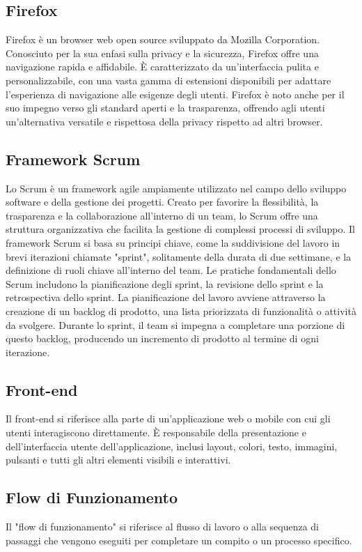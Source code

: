 \documentclass{article}
\begin{document}
\subsection{Firefox}
Firefox è un browser web open source sviluppato da Mozilla Corporation. Conosciuto per la sua enfasi sulla privacy e la sicurezza, Firefox offre una navigazione rapida e affidabile. È caratterizzato da un'interfaccia pulita e personalizzabile, con una vasta gamma di estensioni disponibili per adattare l'esperienza di navigazione alle esigenze degli utenti. Firefox è noto anche per il suo impegno verso gli standard aperti e la trasparenza, offrendo agli utenti un'alternativa versatile e rispettosa della privacy rispetto ad altri browser.

\subsection{Framework Scrum}
Lo Scrum è un framework agile ampiamente utilizzato nel campo dello sviluppo software e della gestione dei progetti. Creato per favorire la flessibilità, la trasparenza e la collaborazione all'interno di un team, lo Scrum offre una struttura organizzativa che facilita la gestione di complessi processi di sviluppo. Il framework Scrum si basa su principi chiave, come la suddivisione del lavoro in brevi iterazioni chiamate "sprint", solitamente della durata di due settimane, e la definizione di ruoli chiave all'interno del team. Le pratiche fondamentali dello Scrum includono la pianificazione degli sprint, la revisione dello sprint e la retrospectiva dello sprint. La pianificazione del lavoro avviene attraverso la creazione di un backlog di prodotto, una lista priorizzata di funzionalità o attività da svolgere. Durante lo sprint, il team si impegna a completare una porzione di questo backlog, producendo un incremento di prodotto al termine di ogni iterazione.

\subsection{Front-end}
Il front-end si riferisce alla parte di un'applicazione web o mobile con cui gli utenti interagiscono direttamente. È responsabile della presentazione e dell'interfaccia utente dell'applicazione, inclusi layout, colori, testo, immagini, pulsanti e tutti gli altri elementi visibili e interattivi.

\subsection{Flow di Funzionamento}
 Il "flow di funzionamento" si riferisce al flusso di lavoro o alla sequenza di passaggi che vengono eseguiti per completare un compito o un processo specifico.
\end{document}
